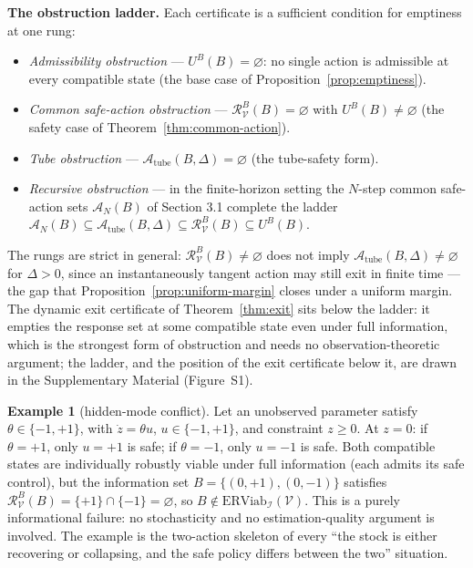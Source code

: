 \documentclass[10pt,twocolumn]{article}
\theoremstyle{definition}
\newtheorem{example}{Example}
\begin{document}
\textbf{The obstruction ladder.} Each certificate is a sufficient
condition for emptiness at one rung:
\begin{itemize}
\item \emph{Admissibility obstruction} --- \(U^B(B)=\varnothing\): no
single action is admissible at every compatible state (the base case of
Proposition~\ref{prop:emptiness}).
\item \emph{Common safe-action obstruction} ---
\(\mathcal{R}_{\mathcal{V}}^B(B)=\varnothing\) with
\(U^B(B)\neq\varnothing\) (the safety case of
Theorem~\ref{thm:common-action}).
\item \emph{Tube obstruction} ---
\(\mathcal{A}_{\mathrm{tube}}(B,\Delta)=\varnothing\) (the tube-safety
form).
\item \emph{Recursive obstruction} --- in the finite-horizon setting the
\(N\)-step common safe-action sets \(\mathcal{A}_N(B)\) of Section 3.1 complete the ladder
\(\mathcal{A}_N(B)\subseteq\mathcal{A}_{\mathrm{tube}}(B,\Delta)\subseteq\mathcal{R}_{\mathcal{V}}^B(B)\subseteq U^B(B)\).
\end{itemize}
The rungs are strict in general: \(\mathcal{R}_{\mathcal{V}}^B(B)\neq\varnothing\)
does not imply \(\mathcal{A}_{\mathrm{tube}}(B,\Delta)\neq\varnothing\)
for \(\Delta>0\), since an instantaneously tangent action may still exit
in finite time --- the gap that Proposition~\ref{prop:uniform-margin}
closes under a uniform margin. The dynamic exit certificate of
Theorem~\ref{thm:exit} sits below the ladder: it empties the response
set at some compatible state even under full information, which is the
strongest form of obstruction and needs no observation-theoretic
argument; the ladder, and the position of the exit certificate below it, are drawn in the Supplementary Material (Figure~S1).



\begin{example}[hidden-mode conflict]\label{ex:hidden-mode} Let an unobserved parameter satisfy
\(\theta \in \{-1, +1\}\), with \(\dot z = \theta u\),
\(u \in \{-1, +1\}\), and constraint \(z \ge 0\). At \(z = 0\): if
\(\theta = +1\), only \(u = +1\) is safe; if \(\theta = -1\), only
\(u = -1\) is safe. Both compatible states are individually robustly
viable under full information (each admits its safe control), but the
information set \(B = \{(0, +1), (0, -1)\}\) satisfies
\(\mathcal{R}_{\mathcal{V}}^B(B) = \{+1\} \cap \{-1\} = \varnothing\),
so \(B \notin \mathrm{ERViab}_{\mathcal{I}}(\mathcal{V})\). This is a
purely informational failure: no stochasticity and no estimation-quality
argument is involved. The example is the two-action skeleton of every
``the stock is either recovering or collapsing, and the safe policy
differs between the two'' situation.

\end{example}
\end{document}
